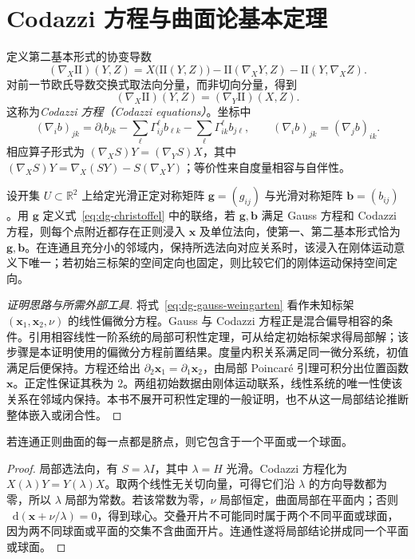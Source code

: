 \documentclass[UTF8,12pt,a4paper,fontset=fandol]{ctexbook}
\newcommand{\R}{\mathbb R}
\newcommand{\dd}{\mathop{}\!\mathrm d}
\begin{document}
\section{Codazzi 方程与曲面论基本定理}
定义第二基本形式的协变导数
\[
 (\nabla_X\mathrm{II})(Y,Z)=X\bigl(\mathrm{II}(Y,Z)\bigr)
 -\mathrm{II}(\nabla_XY,Z)-\mathrm{II}(Y,\nabla_XZ).
\]
对前一节欧氏导数交换式取法向分量，而非切向分量，得到
\begin{equation}
 (\nabla_X\mathrm{II})(Y,Z)=(\nabla_Y\mathrm{II})(X,Z).
 \label{eq:dg-codazzi}
\end{equation}
这称为\emph{Codazzi 方程（Codazzi equations）}。坐标中
\[
 (\nabla_i b)_{jk}=\partial_i b_{jk}
 -\sum_\ell\Gamma^\ell_{ij}b_{\ell k}
 -\sum_\ell\Gamma^\ell_{ik}b_{j\ell},\qquad
 (\nabla_i b)_{jk}=(\nabla_j b)_{ik}.
\]
相应算子形式为 $(\nabla_XS)Y=(\nabla_YS)X$，其中 $(\nabla_XS)Y=\nabla_X(SY)-S(\nabla_XY)$；等价性来自度量相容与自伴性。

\begin{theorem}
设开集 $U\subset\R^2$ 上给定光滑正定对称矩阵 $\mathbf g=(g_{ij})$ 与光滑对称矩阵 $\mathbf b=(b_{ij})$。用 $\mathbf g$ 定义式~\eqref{eq:dg-christoffel} 中的联络，若 $\mathbf g,\mathbf b$ 满足 Gauss 方程和 Codazzi 方程，则每个点附近都存在正则浸入 $\mathbf x$ 及单位法向，使第一、第二基本形式恰为 $\mathbf g,\mathbf b$。在连通且充分小的邻域内，保持所选法向对应关系时，该浸入在刚体运动意义下唯一；若初始三标架的空间定向也固定，则比较它们的刚体运动保持空间定向。
\label{thm:dg-surface-fundamental}
\end{theorem}
\begin{proof}[证明思路与所需外部工具]
将式~\eqref{eq:dg-gauss-weingarten} 看作未知标架 $(\mathbf x_1,\mathbf x_2,\nu)$ 的线性偏微分方程。Gauss 与 Codazzi 方程正是混合偏导相容的条件。引用相容线性一阶系统的局部可积性定理，可从给定初始标架求得局部解；该步骤是本证明使用的偏微分方程前置结果。度量内积关系满足同一微分系统，初值满足后便保持。方程还给出 $\partial_2\mathbf x_1=\partial_1\mathbf x_2$，由局部 Poincar\'e 引理可积分出位置函数 $\mathbf x$。正定性保证其秩为 $2$。两组初始数据由刚体运动联系，线性系统的唯一性使该关系在邻域内保持。本书不展开可积性定理的一般证明，也不从这一局部结论推断整体嵌入或闭合性。
\end{proof}

\begin{corollary}[全脐曲面的刚性]
若连通正则曲面的每一点都是脐点，则它包含于一个平面或一个球面。
\end{corollary}
\begin{proof}
局部选法向，有 $S=\lambda I$，其中 $\lambda=H$ 光滑。Codazzi 方程化为 $X(\lambda)Y=Y(\lambda)X$。取两个线性无关切向量，可得它们沿 $\lambda$ 的方向导数都为零，所以 $\lambda$ 局部为常数。若该常数为零，$\nu$ 局部恒定，曲面局部在平面内；否则 $\dd(\mathbf x+\nu/\lambda)=0$，得到球心。交叠开片不可能同时属于两个不同平面或球面，因为两不同球面或平面的交集不含曲面开片。连通性遂将局部结论拼成同一个平面或球面。
\end{proof}
\end{document}
